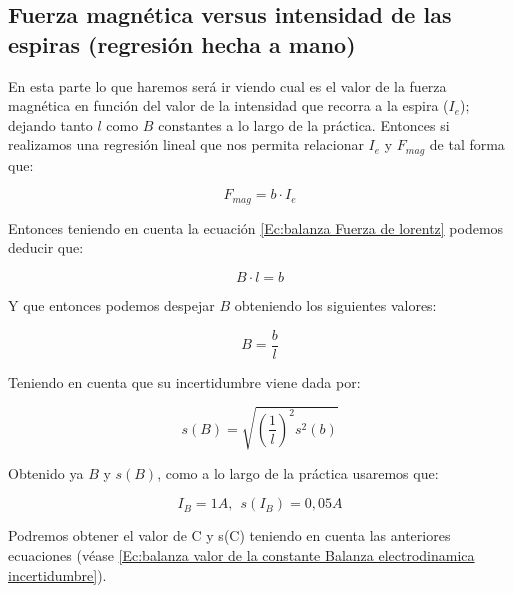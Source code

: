 \documentclass[12pt,a4paper]{book}
\begin{document}
\newpage


\subsection{Fuerza magnética versus intensidad de las espiras (regresión hecha a mano)}


\vspace*{0.5cm}

En esta parte lo que haremos será ir viendo cual es el valor de la fuerza magnética en función del valor de la intensidad que recorra a la espira ($I_e$); dejando tanto $l$ como $B$ constantes a lo largo de la práctica. Entonces si realizamos una regresión lineal que nos permita relacionar $I_e$ y $F_{mag}$ de tal forma que:

$$ F_{mag}=b \cdot I_e $$


\vspace*{0.10cm}

Entonces teniendo en cuenta la ecuación \ref{Ec:balanza Fuerza de lorentz} podemos deducir que:

$$ B \cdot l = b $$

\vspace*{0.10cm}


Y que entonces podemos despejar $B$ obteniendo los siguientes valores:


\begin{equation}
B=\dfrac{b}{l}
\label{Ec: valor de cte con Ie constante balanza electrodnamica}
\end{equation}

\vspace*{0.10cm}


Teniendo en cuenta que su incertidumbre viene dada por:

\begin{equation}
s(B)=\sqrt{(\dfrac{1}{l})^2s^2(b)}
\label{Ec: incertidumbre de cte con Ie constante balanza electrodnamica}
\end{equation}

\vspace*{0.10cm}


Obtenido ya $B$ y $s(B)$, como a lo largo de la práctica usaremos que:

$$ I_B = 1 A, \ \ s(I_B)=0,05 A$$

\vspace*{0.10cm}


Podremos obtener el valor de C y s(C) teniendo en cuenta las anteriores ecuaciones (véase \ref{Ec:balanza valor de la constante Balanza electrodinamica incertidumbre}). \\
\end{document}
